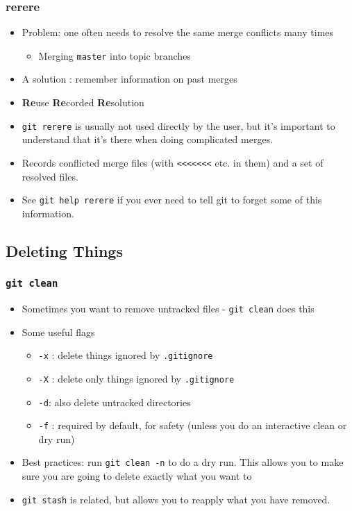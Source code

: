\begin{frame}[fragile]
\frametitle{rerere}
\begin{itemize}
\item Problem: one often needs to resolve the same merge conflicts many times
\begin{itemize}
\item Merging \texttt{master} into topic branches
\end{itemize}
\item A solution : remember information on past merges
\item \textbf{Re}use \textbf{Re}corded \textbf{Re}solution
\item \lstinline{git rerere} is usually not used directly by the user, but it's important to understand that it's there when doing complicated merges.
\item Records conflicted merge files (with \texttt{<<<<<<<} etc. in them) and a set of resolved files.
\item See \texttt{git help rerere} if you ever need to tell git to forget some of this information.
\end{itemize}
\end{frame}

\subsection{Deleting Things}

\begin{frame}[fragile]
\frametitle{\texttt{git clean}}
\begin{itemize}
\item Sometimes you want to remove untracked files - \lstinline{git clean} does this
\item Some useful flags
\begin{itemize}
\item \lstinline{-x} : delete things ignored by \texttt{.gitignore}
\item \lstinline{-X} : delete only things ignored by \texttt{.gitignore}
\item \lstinline{-d}: also delete untracked directories
\item \lstinline{-f} : required by default, for safety (unless you do an interactive clean or dry run)
\end{itemize}
\item Best practices: run \lstinline{git clean -n} to do a dry run. This allows you to make sure you are going to delete exactly what you want to
\item \lstinline{git stash} is related, but allows you to reapply what you have removed.
\end{itemize}
\end{frame}

